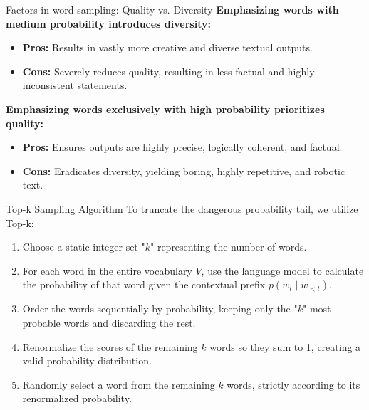 \documentclass[aspectratio=169]{beamer}
\begin{document}
\begin{frame}{Factors in word sampling: Quality vs. Diversity}\justifying
    \textbf{Emphasizing words with medium probability introduces diversity:}
    \begin{itemize}
        \item \textbf{Pros:} Results in vastly more creative and diverse textual outputs.
        \item \textbf{Cons:} Severely reduces quality, resulting in less factual and highly inconsistent statements.
    \end{itemize}
    \vspace{0.5cm}
    \textbf{Emphasizing words exclusively with high probability prioritizes quality:}
    \begin{itemize}
        \item \textbf{Pros:} Ensures outputs are highly precise, logically coherent, and factual.
        \item \textbf{Cons:} Eradicates diversity, yielding boring, highly repetitive, and robotic text.
    \end{itemize}
\end{frame}

\begin{frame}{Top-k Sampling Algorithm}\justifying
    To truncate the dangerous probability tail, we utilize Top-k:
    \begin{enumerate}
        \item Choose a static integer set "$k$" representing the number of words.
        \item For each word in the entire vocabulary $V$, use the language model to calculate the probability of that word given the contextual prefix $p(w_t \mid w_{<t})$.
        \item Order the words sequentially by probability, keeping only the "$k$" most probable words and discarding the rest.
        \item Renormalize the scores of the remaining $k$ words so they sum to 1, creating a valid probability distribution.
        \item Randomly select a word from the remaining $k$ words, strictly according to its renormalized probability.
    \end{enumerate}
\end{frame}
\end{document}
